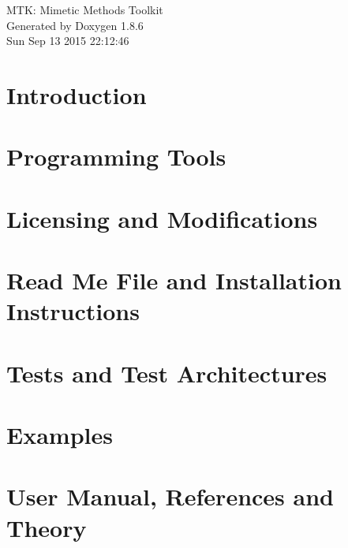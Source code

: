 \documentclass[twoside]{book}
\newcommand{\clearemptydoublepage}{%
  \newpage{\pagestyle{empty}\cleardoublepage}%
}
\begin{document}
\hypersetup{pageanchor=false}
\begin{titlepage}
\vspace*{7cm}
\begin{center}%
{\Large M\-T\-K\-: Mimetic Methods Toolkit }\\
\vspace*{1cm}
{\large Generated by Doxygen 1.8.6}\\
\vspace*{0.5cm}
{\small Sun Sep 13 2015 22:12:46}\\
\end{center}
\end{titlepage}
\clearemptydoublepage
\tableofcontents
\clearemptydoublepage
{}
\hypersetup{pageanchor=true}

\chapter{Introduction}
\label{index}\hypertarget{index}{}
\chapter{Programming Tools}
\label{section_prog_tools}
\hypertarget{section_prog_tools}{}

\chapter{Licensing and Modifications}
\label{section_license_mod}
\hypertarget{section_license_mod}{}

\chapter{Read Me File and Installation Instructions}
\label{page_readme}
\hypertarget{page_readme}{}

\chapter{Tests and Test Architectures}
\label{page_architectures}
\hypertarget{page_architectures}{}

\chapter{Examples}
\label{page_examples}
\hypertarget{page_examples}{}

\chapter{User Manual, References and Theory}
\label{page_ref_the}
\hypertarget{page_ref_the}{}

\end{document}
